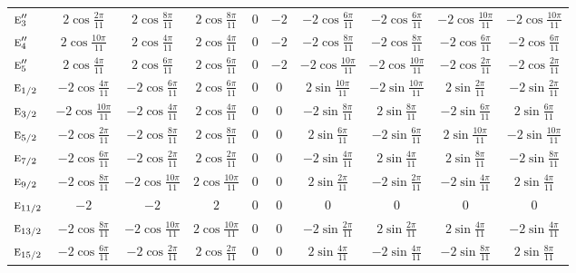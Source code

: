 \documentclass[10pt,a4paper]{article}
\makeatletter
\def\grouprule#1#2{\noalign{\marks\LTgroupmarks{\the\belowrulesep}\nobreak\vskip#1%
  \vskip\aboverulesep}\multispan\LT@cols\unskip{\leaders\hrule\@height#2\hfill\kern\z@}\cr
  \noalign{\penalty\LTrulebreak\vskip\belowrulesep\global\@lastruleclass\z@}}
\numberwithin{equation}{section}
\newcommand{\irr}[1]{\text{\normalfont\scshape #1}}
\makeatother
\begin{document}
{{\begin{longtable}{@{}lccccccccc@{}}
$\irr{e}_{3}''$ & $2\cos\tfrac{2\pi}{11}$ & $2\cos\tfrac{8\pi}{11}$ & $2\cos\tfrac{8\pi}{11}$ & $0$ & $-2$ & $-2\cos\tfrac{6\pi}{11}$ & $-2\cos\tfrac{6\pi}{11}$ & $-2\cos\tfrac{10\pi}{11}$ & $-2\cos\tfrac{10\pi}{11}$\\
$\irr{e}_{4}''$ & $2\cos\tfrac{10\pi}{11}$ & $2\cos\tfrac{4\pi}{11}$ & $2\cos\tfrac{4\pi}{11}$ & $0$ & $-2$ & $-2\cos\tfrac{8\pi}{11}$ & $-2\cos\tfrac{8\pi}{11}$ & $-2\cos\tfrac{6\pi}{11}$ & $-2\cos\tfrac{6\pi}{11}$\\
$\irr{e}_{5}''$ & $2\cos\tfrac{4\pi}{11}$ & $2\cos\tfrac{6\pi}{11}$ & $2\cos\tfrac{6\pi}{11}$ & $0$ & $-2$ & $-2\cos\tfrac{10\pi}{11}$ & $-2\cos\tfrac{10\pi}{11}$ & $-2\cos\tfrac{2\pi}{11}$ & $-2\cos\tfrac{2\pi}{11}$\\
\grouprule{0pt}{\lightrulewidth}
$\irr{e}_{1/2}$ & $-2\cos\tfrac{4\pi}{11}$ & $-2\cos\tfrac{6\pi}{11}$ & $2\cos\tfrac{6\pi}{11}$ & $0$ & $0$ & $2\sin\tfrac{10\pi}{11}$ & $-2\sin\tfrac{10\pi}{11}$ & $2\sin\tfrac{2\pi}{11}$ & $-2\sin\tfrac{2\pi}{11}$\\
$\irr{e}_{3/2}$ & $-2\cos\tfrac{10\pi}{11}$ & $-2\cos\tfrac{4\pi}{11}$ & $2\cos\tfrac{4\pi}{11}$ & $0$ & $0$ & $-2\sin\tfrac{8\pi}{11}$ & $2\sin\tfrac{8\pi}{11}$ & $-2\sin\tfrac{6\pi}{11}$ & $2\sin\tfrac{6\pi}{11}$\\
$\irr{e}_{5/2}$ & $-2\cos\tfrac{2\pi}{11}$ & $-2\cos\tfrac{8\pi}{11}$ & $2\cos\tfrac{8\pi}{11}$ & $0$ & $0$ & $2\sin\tfrac{6\pi}{11}$ & $-2\sin\tfrac{6\pi}{11}$ & $2\sin\tfrac{10\pi}{11}$ & $-2\sin\tfrac{10\pi}{11}$\\
$\irr{e}_{7/2}$ & $-2\cos\tfrac{6\pi}{11}$ & $-2\cos\tfrac{2\pi}{11}$ & $2\cos\tfrac{2\pi}{11}$ & $0$ & $0$ & $-2\sin\tfrac{4\pi}{11}$ & $2\sin\tfrac{4\pi}{11}$ & $2\sin\tfrac{8\pi}{11}$ & $-2\sin\tfrac{8\pi}{11}$\\
$\irr{e}_{9/2}$ & $-2\cos\tfrac{8\pi}{11}$ & $-2\cos\tfrac{10\pi}{11}$ & $2\cos\tfrac{10\pi}{11}$ & $0$ & $0$ & $2\sin\tfrac{2\pi}{11}$ & $-2\sin\tfrac{2\pi}{11}$ & $-2\sin\tfrac{4\pi}{11}$ & $2\sin\tfrac{4\pi}{11}$\\
$\irr{e}_{11/2}$ & $-2$ & $-2$ & $2$ & $0$ & $0$ & $0$ & $0$ & $0$ & $0$\\
$\irr{e}_{13/2}$ & $-2\cos\tfrac{8\pi}{11}$ & $-2\cos\tfrac{10\pi}{11}$ & $2\cos\tfrac{10\pi}{11}$ & $0$ & $0$ & $-2\sin\tfrac{2\pi}{11}$ & $2\sin\tfrac{2\pi}{11}$ & $2\sin\tfrac{4\pi}{11}$ & $-2\sin\tfrac{4\pi}{11}$\\
$\irr{e}_{15/2}$ & $-2\cos\tfrac{6\pi}{11}$ & $-2\cos\tfrac{2\pi}{11}$ & $2\cos\tfrac{2\pi}{11}$ & $0$ & $0$ & $2\sin\tfrac{4\pi}{11}$ & $-2\sin\tfrac{4\pi}{11}$ & $-2\sin\tfrac{8\pi}{11}$ & $2\sin\tfrac{8\pi}{11}$\\

\end{longtable}}}
\end{document}
